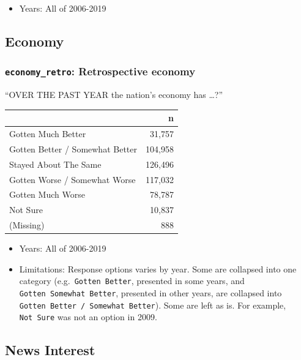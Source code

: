 \documentclass[10pt,article,oneside]{memoir}
\theoremstyle{definition}
\begin{document}
\begin{itemize}
\tightlist
\item
  Years: All of 2006-2019
\end{itemize}

\hypertarget{economy}{%
\subsection{Economy}\label{economy}}

\hypertarget{economy_retro-retrospective-economy}{%
\subsubsection{\texorpdfstring{\texttt{economy\_retro}: Retrospective
economy}{economy\_retro: Retrospective economy}}\label{economy_retro-retrospective-economy}}

``OVER THE PAST YEAR the nation's economy has \ldots?''

\begin{table}[H]
\centering
\begin{tabular}{lr}
\toprule
 & n\\
\midrule
Gotten Much Better & 31,757\\
Gotten Better / Somewhat Better & 104,958\\
Stayed About The Same & 126,496\\
Gotten Worse / Somewhat Worse & 117,032\\
Gotten Much Worse & 78,787\\
Not Sure & 10,837\\
(Missing) & 888\\
\bottomrule
\end{tabular}
\end{table}

\begin{itemize}
\tightlist
\item
  Years: All of 2006-2019
\item
  Limitations: Response options varies by year. Some are collapsed into
  one category (e.g.~\texttt{Gotten\ Better}, presented in some years,
  and \texttt{Gotten\ Somewhat\ Better}, presented in other years, are
  collapsed into \texttt{Gotten\ Better\ /\ Somewhat\ Better}). Some are
  left as is. For example, \texttt{Not\ Sure} was not an option in 2009.
\end{itemize}

\hypertarget{news-interest}{%
\subsection{News Interest}\label{news-interest}}
\end{document}
